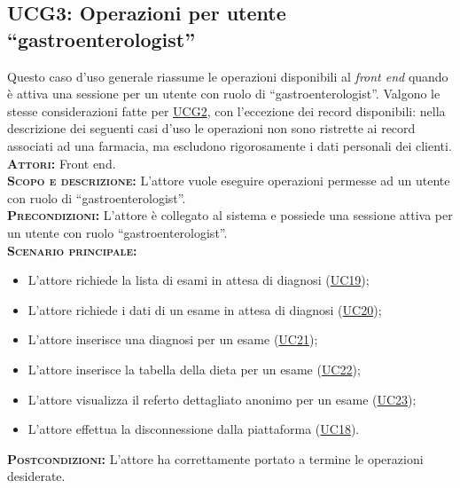 \subsection{UCG3: Operazioni per utente ``gastroenterologist''}
\label{sec:UCG3}
Questo caso d'uso generale riassume le operazioni disponibili al \textit{front end} quando è attiva una sessione per un utente con ruolo di ``gastroenterologist''. Valgono le stesse considerazioni fatte per \hyperref[sec:UCG2]{UCG2}, con l'eccezione dei record disponibili: nella descrizione dei seguenti casi d'uso le operazioni non sono ristrette ai record associati ad una farmacia, ma escludono rigorosamente i dati personali dei clienti.\\
\textsc{\textbf{Attori:}} Front end.\\
\textsc{\textbf{Scopo e descrizione:}} L'attore vuole eseguire operazioni permesse ad un utente con ruolo di ``gastroenterologist''.\\
\textsc{\textbf{Precondizioni:}} L'attore è collegato al sistema e possiede una sessione attiva per un utente con ruolo ``gastroenterologist''.\\
\textsc{\textbf{Scenario principale:}} 
\begin{itemize}
    \item L'attore richiede la lista di esami in attesa di diagnosi (\hyperref[sec:UC19]{UC19});
    \item L'attore richiede i dati di un esame in attesa di diagnosi (\hyperref[sec:UC20]{UC20});
    \item L'attore inserisce una diagnosi per un esame (\hyperref[sec:UC21]{UC21});
    \item L'attore inserisce la tabella della dieta per un esame (\hyperref[sec:UC22]{UC22});
    \item L'attore visualizza il referto dettagliato anonimo per un esame (\hyperref[sec:UC23]{UC23});
    \item L'attore effettua la disconnessione dalla piattaforma (\hyperref[sec:UC18]{UC18}).
\end{itemize}
\textsc{\textbf{Postcondizioni:}} L'attore ha correttamente portato a termine le operazioni desiderate.

